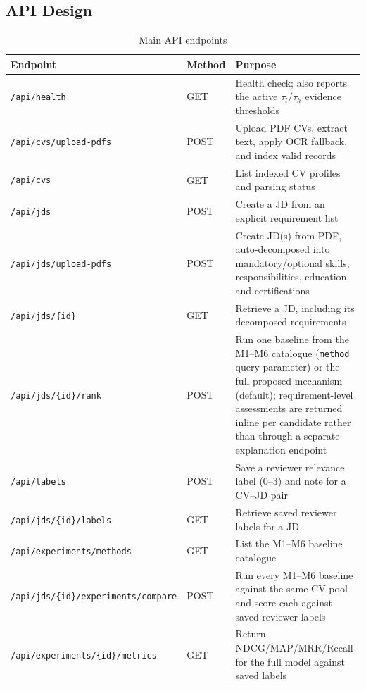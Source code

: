 \documentclass[12pt,a4paper,oneside]{report}
\begin{document}
\subsection{API Design}
\begin{table}[htbp]
\centering
\caption{Main API endpoints}
\label{tab:api}
\begin{tabularx}{\textwidth}{p{}p{}X}
\toprule
Endpoint & Method & Purpose \\
\midrule
\texttt{/api/\allowbreak health} & GET & Health check; also reports the active $\tau_l$/$\tau_h$ evidence thresholds \\
\texttt{/api/\allowbreak cvs/\allowbreak upload-pdfs} & POST & Upload PDF CVs, extract text, apply OCR fallback, and index valid records \\
\texttt{/api/\allowbreak cvs} & GET & List indexed CV profiles and parsing status \\
\texttt{/api/\allowbreak jds} & POST & Create a JD from an explicit requirement list \\
\texttt{/api/\allowbreak jds/\allowbreak upload-pdfs} & POST & Create JD(s) from PDF, auto-decomposed into mandatory/optional skills, responsibilities, education, and certifications \\
\texttt{/api/\allowbreak jds/\allowbreak \{id\}} & GET & Retrieve a JD, including its decomposed requirements \\
\texttt{/api/\allowbreak jds/\allowbreak \{id\}/\allowbreak rank} & POST & Run one baseline from the M1--M6 catalogue (\texttt{method} query parameter) or the full proposed mechanism (default); requirement-level assessments are returned inline per candidate rather than through a separate explanation endpoint \\
\texttt{/api/\allowbreak labels} & POST & Save a reviewer relevance label (0--3) and note for a CV--JD pair \\
\texttt{/api/\allowbreak jds/\allowbreak \{id\}/\allowbreak labels} & GET & Retrieve saved reviewer labels for a JD \\
\texttt{/api/\allowbreak experiments/\allowbreak methods} & GET & List the M1--M6 baseline catalogue \\
\texttt{/api/\allowbreak jds/\allowbreak \{id\}/\allowbreak experiments/\allowbreak compare} & POST & Run every M1--M6 baseline against the same CV pool and score each against saved reviewer labels \\
\texttt{/api/\allowbreak experiments/\allowbreak \{id\}/\allowbreak metrics} & GET & Return NDCG/MAP/MRR/Recall for the full model against saved labels \\
\bottomrule
\end{tabularx}
\end{table}
\end{document}
